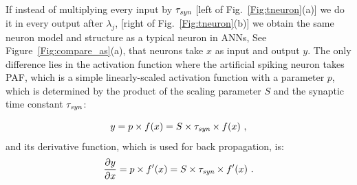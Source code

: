 \documentclass[10pt,journal,compsoc]{IEEEtran}
\begin{document}
	If instead of multiplying every input by $\tau_{\textit{\textrm{syn}}}$ [left of Fig.~\ref{Fig:tneuron}(a)] we do it in every output after $\lambda_j$, [right of Fig.~\ref{Fig:tneuron}(b)] we obtain the same neuron model and structure as a typical neuron in ANNs, See Figure~\ref{Fig:compare_as}(a), that neurons take $x$ as input and output $y$.
	The only difference lies in the activation function where the artificial spiking neuron takes PAF, which is a simple linearly-scaled activation function with a parameter $p$, which is determined by the product of the scaling parameter $S$ and the synaptic time constant $\tau_{\textit{\textrm{syn}}}$:

\begin{equation}
	y = p \times f(x) = S \times \tau_{\textit{\textrm{syn}}} \times f(x)~,
	\label{equ:PAF}
	\end{equation}
	and its derivative function, which is used for back propagation, is:
	\begin{equation}
	\frac{\partial y}{\partial x} = p \times f'(x) = S \times \tau_{\textit{\textrm{syn}}} \times f'(x)~.
	\end{equation}
	
\end{document}

